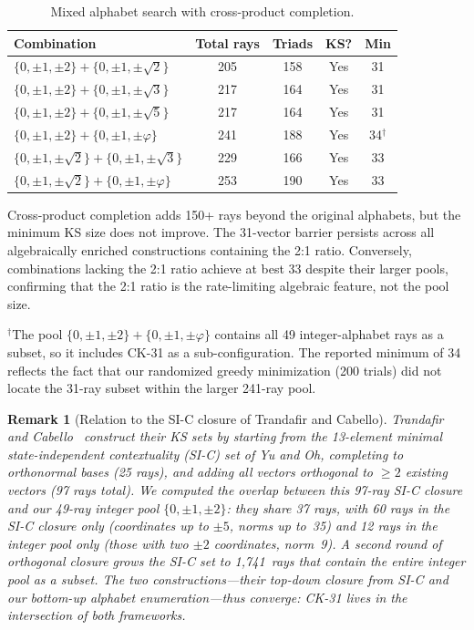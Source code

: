 \documentclass[12pt,a4paper]{article}
\newtheorem{remark}[theorem]{Remark}
\begin{document}
\begin{table}[ht]
\centering
\caption{Mixed alphabet search with cross-product completion.}
\label{tab:mixed}
\begin{tabular}{lcccc}
\toprule
Combination & Total rays & Triads & KS? & Min \\
\midrule
$\{0,\pm 1,\pm 2\} + \{0,\pm 1,\pm\sqrt{2}\}$ & 205 & 158 & Yes & 31 \\
$\{0,\pm 1,\pm 2\} + \{0,\pm 1,\pm\sqrt{3}\}$ & 217 & 164 & Yes & 31 \\
$\{0,\pm 1,\pm 2\} + \{0,\pm 1,\pm\sqrt{5}\}$ & 217 & 164 & Yes & 31 \\
$\{0,\pm 1,\pm 2\} + \{0,\pm 1,\pm\varphi\}$ & 241 & 188 & Yes & 34$^\dagger$ \\
$\{0,\pm 1,\pm\sqrt{2}\} + \{0,\pm 1,\pm\sqrt{3}\}$ & 229 & 166 & Yes & 33 \\
$\{0,\pm 1,\pm\sqrt{2}\} + \{0,\pm 1,\pm\varphi\}$ & 253 & 190 & Yes & 33 \\
\bottomrule
\end{tabular}
\end{table}

Cross-product completion adds 150+ rays beyond the original alphabets, but the minimum KS size does not improve. The 31-vector barrier persists across all algebraically enriched constructions containing the 2:1 ratio. Conversely, combinations lacking the 2:1 ratio achieve at best 33 despite their larger pools, confirming that the 2:1 ratio is the rate-limiting algebraic feature, not the pool size.

\smallskip\noindent$^\dagger$The pool $\{0,\pm 1,\pm 2\} + \{0,\pm 1,\pm\varphi\}$ contains all 49 integer-alphabet rays as a subset, so it includes CK-31 as a sub-configuration. The reported minimum of 34 reflects the fact that our randomized greedy minimization (200 trials) did not locate the 31-ray subset within the larger 241-ray pool.

\begin{remark}[Relation to the SI-C closure of Trandafir and Cabello]
Trandafir and Cabello~\cite{TrandafirCabello2025} construct their KS sets by starting from the 13-element minimal state-independent contextuality (SI-C) set of Yu and Oh, completing to orthonormal bases (25 rays), and adding all vectors orthogonal to $\geq 2$ existing vectors (97 rays total).  We computed the overlap between this 97-ray SI-C closure and our 49-ray integer pool $\{0,\pm1,\pm2\}$: they share 37 rays, with 60 rays in the SI-C closure only (coordinates up to $\pm 5$, norms up to~35) and 12 rays in the integer pool only (those with two $\pm 2$ coordinates, norm~9).  A second round of orthogonal closure grows the SI-C set to 1{,}741~rays that \emph{contain} the entire integer pool as a subset.  The two constructions---their top-down closure from SI-C and our bottom-up alphabet enumeration---thus converge: CK-31 lives in the intersection of both frameworks.
\end{remark}
\end{document}
